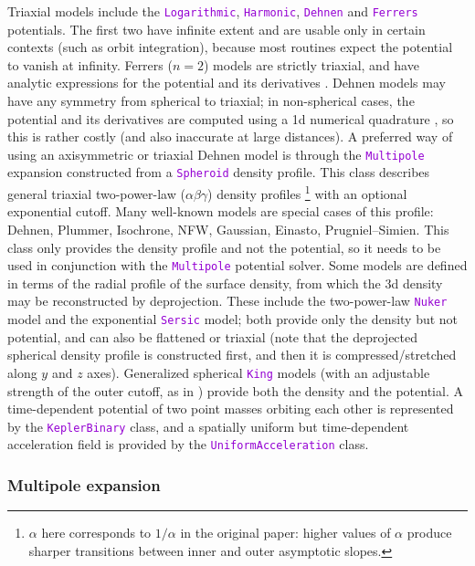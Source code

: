 \documentclass[12pt]{article}
\newcommand{\ttt}[1]{\textcolor{darkviolet}{\texttt{#1}}}
\begin{document}
Triaxial models include the \ttt{Logarithmic}, \ttt{Harmonic}, \ttt{Dehnen} \cite{Dehnen1993} and \ttt{Ferrers} potentials. The first two have infinite extent and are usable only in certain contexts (such as orbit integration), because most routines expect the potential to vanish at infinity. Ferrers ($n=2$) models are strictly triaxial, and have analytic expressions for the potential and its derivatives \cite{Pfenniger1984}. Dehnen models may have any symmetry from spherical to triaxial; in non-spherical cases, the potential and its derivatives are computed using a 1d numerical quadrature \cite{MerrittFridman1996}, so this is rather costly (and also inaccurate at large distances). A preferred way of using an axisymmetric or triaxial Dehnen model is through the \ttt{Multipole} expansion constructed from a \ttt{Spheroid} density profile. 
This class describes general triaxial two-power-law ($\alpha\beta\gamma$) density profiles%
\footnote{$\alpha$ here corresponds to $1/\alpha$ in the original paper: higher values of $\alpha$ produce sharper transitions between inner and outer asymptotic slopes.}
\cite{Zhao1996} with an optional exponential cutoff. Many well-known models are special cases of this profile: Dehnen, Plummer, Isochrone, NFW, Gaussian, Einasto, Prugniel--Simien.
This class only provides the density profile and not the potential, so it needs to be used in conjunction with the \ttt{Multipole} potential solver. Some models are defined in terms of the radial profile of the surface density, from which the 3d density may be reconstructed by deprojection. These include the two-power-law \ttt{Nuker} model and the exponential \ttt{Sersic} model; both provide only the density but not potential, and can also be flattened or triaxial (note that the deprojected spherical density profile is constructed first, and then it is compressed/stretched along $y$ and $z$ axes). 
Generalized spherical \ttt{King} models (with an adjustable strength of the outer cutoff, as in \cite{GielesZocchi2015}) provide both the density and the potential.
A time-dependent potential of two point masses orbiting each other is represented by the \ttt{KeplerBinary} class, and a spatially uniform but time-dependent acceleration field is provided by the \ttt{UniformAcceleration} class.


\subsubsection{Multipole expansion}  \label{sec:PotentialMultipole}
\end{document}

